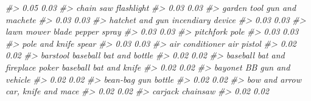 \documentclass[
  12pt,
]{book}
\newenvironment{Shaded}{\begin{snugshade}}{\end{snugshade}}
\newcommand{\CommentTok}[1]{\textcolor[rgb]{0.37,0.37,0.37}{\textit{#1}}}
\begin{document}
\begin{Shaded}
\begin{Highlighting}[]
\CommentTok{\#\textgreater{}                             0.05                             0.03 }
\CommentTok{\#\textgreater{}                        chain saw                       flashlight }
\CommentTok{\#\textgreater{}                             0.03                             0.03 }
\CommentTok{\#\textgreater{}                      garden tool                  gun and machete }
\CommentTok{\#\textgreater{}                             0.03                             0.03 }
\CommentTok{\#\textgreater{}                  hatchet and gun                incendiary device }
\CommentTok{\#\textgreater{}                             0.03                             0.03 }
\CommentTok{\#\textgreater{}                 lawn mower blade                     pepper spray }
\CommentTok{\#\textgreater{}                             0.03                             0.03 }
\CommentTok{\#\textgreater{}                        pitchfork                             pole }
\CommentTok{\#\textgreater{}                             0.03                             0.03 }
\CommentTok{\#\textgreater{}                   pole and knife                            spear }
\CommentTok{\#\textgreater{}                             0.03                             0.03 }
\CommentTok{\#\textgreater{}                  air conditioner                       air pistol }
\CommentTok{\#\textgreater{}                             0.02                             0.02 }
\CommentTok{\#\textgreater{}                         barstool          baseball bat and bottle }
\CommentTok{\#\textgreater{}                             0.02                             0.02 }
\CommentTok{\#\textgreater{} baseball bat and fireplace poker           baseball bat and knife }
\CommentTok{\#\textgreater{}                             0.02                             0.02 }
\CommentTok{\#\textgreater{}                          bayonet               BB gun and vehicle }
\CommentTok{\#\textgreater{}                             0.02                             0.02 }
\CommentTok{\#\textgreater{}                     bean{-}bag gun                           bottle }
\CommentTok{\#\textgreater{}                             0.02                             0.02 }
\CommentTok{\#\textgreater{}                    bow and arrow              car, knife and mace }
\CommentTok{\#\textgreater{}                             0.02                             0.02 }
\CommentTok{\#\textgreater{}                          carjack                         chainsaw }
\CommentTok{\#\textgreater{}                             0.02                             0.02 }

\end{Highlighting}
\end{Shaded}
\end{document}
